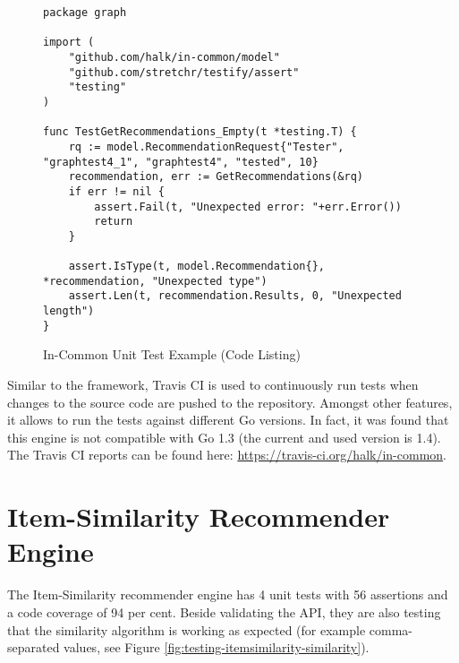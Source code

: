 \begin{figure}[!ht]
    \begin{verbatim}
package graph

import (
    "github.com/halk/in-common/model"
    "github.com/stretchr/testify/assert"
    "testing"
)

func TestGetRecommendations_Empty(t *testing.T) {
    rq := model.RecommendationRequest{"Tester", "graphtest4_1", "graphtest4", "tested", 10}
    recommendation, err := GetRecommendations(&rq)
    if err != nil {
        assert.Fail(t, "Unexpected error: "+err.Error())
        return
    }

    assert.IsType(t, model.Recommendation{}, *recommendation, "Unexpected type")
    assert.Len(t, recommendation.Results, 0, "Unexpected length")
}
    \end{verbatim}
    \caption{In-Common Unit Test Example (Code Listing)}
    \label{fig:testing-incommon-recommendation-query}
\end{figure}

Similar to the framework, Travis CI is used to continuously run tests when changes to the source code are pushed to the repository. Amongst other features, it allows to run the tests against different Go versions. In fact, it was found that this engine is not compatible with Go 1.3 (the current and used version is 1.4). The Travis CI reports can be found here: \url{https://travis-ci.org/halk/in-common}.

\section{Item-Similarity Recommender Engine}

The Item-Similarity recommender engine has 4 unit tests with 56 assertions and a code coverage of 94 per cent. Beside validating the API, they are also testing that the similarity algorithm is working as expected (for example comma-separated values, see Figure \ref{fig:testing-itemsimilarity-similarity}).

